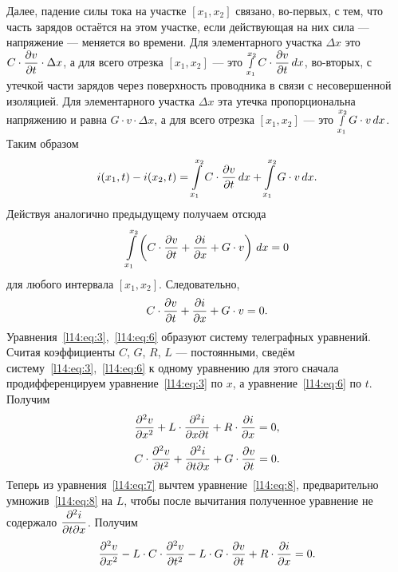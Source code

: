 Далее, падение силы тока на участке $[x_1,x_2]$ связано, во-первых, с тем, что часть зарядов остаётся на этом участке, если действующая на них сила --- напряжение --- меняется во времени. Для элементарного участка $\Delta x$ это  $\displaystyle C\cdot\frac{\partial v}{\partial t}\cdot\Delta x$, а для всего отрезка $[x_1,x_2]$ --- это $\displaystyle\smallint\limits_{x_1}^{x_2}C\cdot\frac{\partial v}{\partial t}\,dx$,	во-вторых, с утечкой части зарядов через поверхность проводника в связи с несовершенной изоляцией. Для элементарного участка $\Delta x$ эта утечка пропорциональна напряжению и равна $G\cdot v\cdot\Delta x$, а для всего отрезка $[x_1,x_2]$ --- это $\displaystyle\smallint\limits_{x_1}^{x_2}G\cdot v\,dx$.
Таким образом 
\begin{equation}\label{l14:eq:4}
	\hfill i(x_1,t)-i(x_2,t)=\int\limits_{x_1}^{x_2}C\cdot\pder{v}{t}\,dx+\int\limits_{x_1}^{x_2}G\cdot v\,dx.\hfill
\end{equation} 
Действуя аналогично предыдущему получаем отсюда
\begin{equation}\label{l14:eq:5}
	\hfill \int\limits_{x_1}^{x_2}\left(C\cdot\pder{v}{t}+\pder{i}{x}+G\cdot v\right)\,dx=0\hfill
\end{equation} 
для любого интервала $[x_1,x_2]$. Следовательно,
\begin{equation}\label{l14:eq:6}
	\hfill C\cdot\pder{v}{t}+\pder{i}{x}+G\cdot v=0.\hfill
\end{equation}  
Уравнения~\eqref{l14:eq:3},~\eqref{l14:eq:6} образуют систему телеграфных уравнений. Считая коэффициенты $C$, $G$, $R$, $L$ --- постоянными, сведём систему~\eqref{l14:eq:3},~\eqref{l14:eq:6} к одному уравнению для этого сначала продифференцируем уравнение~\eqref{l14:eq:3} по $x$, а уравнение~\eqref{l14:eq:6} по $t$. Получим 
\begin{equation}\label{l14:eq:7}
	\hfill \pdder{v}{x}+L\cdot\pder{^2i}{x\partial t}+R\cdot \pder{i}{x}=0,\hfill
\end{equation}
\begin{equation}\label{l14:eq:8}
	\hfill C\cdot\pdder{v}{t}+\pder{^2i}{t\partial x}+G\cdot \pder{v}{t}=0.\hfill
\end{equation} 
Теперь из уравнения~\eqref{l14:eq:7} вычтем уравнение~\eqref{l14:eq:8}, предварительно умножив~\eqref{l14:eq:8} на $L$, чтобы после вычитания полученное уравнение не содержало $\displaystyle\frac{\partial^2i}{\partial t\partial x}$. Получим
\begin{equation}\label{l14:eq:9}
	\hfill \pdder{v}{x}-L\cdot C\cdot\pdder{v}{t}-L\cdot G\cdot \pder{v}{t}+R\cdot \pder{i}{x}=0.\hfill
\end{equation} 
